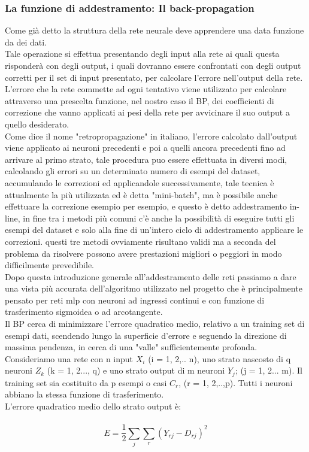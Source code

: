 \documentclass[10pt,a4paper]{article}
\begin{document}
\subsubsection{La funzione di addestramento: Il back-propagation} 
Come già detto la struttura della rete neurale deve apprendere una data funzione da dei dati.\\
Tale operazione si effettua presentando degli input alla rete ai quali questa risponderà con degli output, i quali dovranno essere confrontati con degli output corretti per il set di input presentato, per calcolare l'errore nell'output della rete.\\
L'errore che la rete commette ad ogni tentativo viene utilizzato per calcolare attraverso una prescelta funzione, nel nostro caso il BP, dei coefficienti di correzione che vanno applicati ai pesi della rete per avvicinare il suo output a quello desiderato. \\
Come dice il nome "retropropagazione" in italiano, l'errore calcolato dall'output viene applicato ai neuroni precedenti e poi a quelli ancora precedenti fino ad arrivare al primo strato, tale procedura puo essere effettuata in diversi modi, calcolando gli errori su un determinato numero di esempi del dataset, accumulando le correzioni ed applicandole successivamente, tale tecnica è attualmente la più utilizzata ed è detta "mini-batch", ma è possibile anche effettuare la correzione esempio per esempio, e questo è detto addestramento in-line, in fine tra i metodi più comuni c'è anche la possibilità di eseguire tutti gli esempi del dataset e solo alla fine di un'intero ciclo di addestramento applicare le correzioni. questi tre metodi ovviamente risultano validi ma a seconda del problema da risolvere possono avere prestazioni migliori o peggiori in modo difficilmente prevedibile.
\\
Dopo questa introduzione generale all'addestramento delle reti passiamo a dare una vista più accurata dell'algoritmo utilizzato nel progetto che è principalmente pensato per reti mlp con neuroni ad ingressi continui e con funzione di trasferimento sigmoidea o ad arcotangente.
\\
Il BP cerca di minimizzare l'errore quadratico medio, relativo a un training set di esempi dati, scendendo lungo la superficie d'errore e seguendo la direzione di massima pendenza, in cerca di una "valle" sufficientemente profonda. \\
Consideriamo una rete con n input $X_i$ (i = 1, 2,.. n), uno strato nascosto di q neuroni $Z_k$ (k = 1, 2..., q) e uno strato output di m neuroni $Y_j$; (j = 1, 2... m).
Il training set sia costituito da p esempi o casi $C_r$, (r = 1, 2,..,p). Tutti i neuroni abbiano la stessa funzione di trasferimento.\\
L'errore quadratico medio dello strato output è:\\ \\
\begin{equation} \label{eq:eqm}
E = \frac{1}{2} \sum_j{\sum_r{(Y_{rj} - D_{rj})^2}}
\end{equation}
\end{document}
